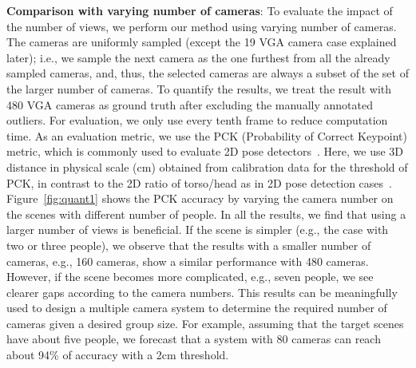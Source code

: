 \textbf{Comparison with varying number of cameras}: To evaluate the impact of the number of views, we perform our method using varying number of cameras. The cameras are uniformly sampled (except the 19 VGA camera case explained later); i.e., we sample the next camera as the one furthest from all the already sampled cameras, and, thus, the selected cameras are always a subset of the set of the larger number of cameras. To quantify the results, we treat the result with 480 VGA cameras as ground truth after excluding the manually annotated outliers. For evaluation, we only use every tenth frame to reduce computation time. As an evaluation metric, we use the PCK (Probability of Correct Keypoint) metric, which is commonly used to evaluate 2D pose detectors~\cite{Andriluka-14}. Here, we use 3D distance in physical scale (cm) obtained from calibration data for the threshold of PCK, in contrast to the 2D ratio of torso/head as in 2D pose detection cases~\cite{Andriluka-14}. Figure~\ref{fig:quant1} shows the PCK accuracy by varying the camera number on the scenes with different number of people. In all the results, we find that using a larger number of views is beneficial. If the scene is simpler (e.g., the case with two or three people), we observe that the results with a smaller number of cameras, e.g., 160 cameras, show a similar performance with 480 cameras. However, if the scene becomes more complicated, e.g., seven people, we see clearer gaps according to the camera numbers. This results can be meaningfully used to design a multiple camera system to determine the required number of cameras given a desired group size. For example, assuming that the target scenes have about five people, we forecast that a system with 80 cameras can reach about 94\% of accuracy with a 2cm threshold. 


